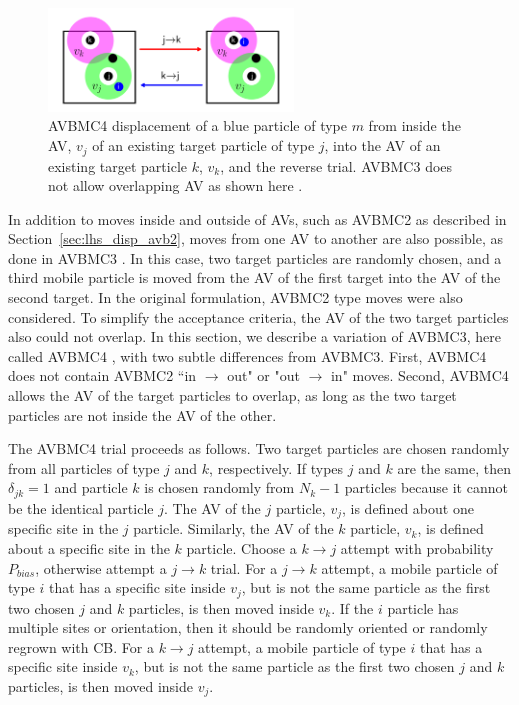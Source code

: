 \documentclass[
  9pt,
  bestpractices,
]{livecoms}
\begin{document}
\begin{figure}
\begin{centering}
\includegraphics[width=6.5cm]{../figures/avb4.png}
\caption{
AVBMC4 displacement of a blue particle of type $m$ from inside the AV, $v_j$ of an existing target particle of type $j$, into the AV of an existing target particle $k$, $v_k$, and the reverse trial.
AVBMC3 does not allow overlapping AV as shown here \cite{chen_improving_2001}.
}
\label{fig:avbmc4}
\end{centering}
\end{figure}

In addition to moves inside and outside of AVs, such as AVBMC2 as described in Section~\ref{sec:lhs_disp_avb2}, moves from one AV to another are also possible, as done in AVBMC3 \cite{chen_improving_2001}.
In this case, two target particles are randomly chosen, and a third mobile particle is moved from the AV of the first target into the AV of the second target.
In the original formulation, AVBMC2 type moves were also considered.
To simplify the acceptance criteria, the AV of the two target particles also could not overlap.
In this section, we describe a variation of AVBMC3, here called AVBMC4 \cite{siderius_flat-histogram_2024}, with two subtle differences from AVBMC3.
First, AVBMC4 does not contain AVBMC2 ``in $\rightarrow$ out" or "out $\rightarrow$ in" moves.
Second, AVBMC4 allows the AV of the target particles to overlap, as long as the two target particles are not inside the AV of the other.

The AVBMC4 trial proceeds as follows.
Two target particles are chosen randomly from all particles of type $j$ and $k$, respectively.
If types $j$ and $k$ are the same, then $\delta_{jk}=1$ and particle $k$ is chosen randomly from $N_k-1$ particles because it cannot be the identical particle $j$.
The AV of the $j$ particle, $v_j$, is defined about one specific site in the $j$ particle.
Similarly, the AV of the $k$ particle, $v_k$, is defined about a specific site in the $k$ particle.
Choose a $k\rightarrow j$ attempt with probability $P_{bias}$, otherwise attempt a $j\rightarrow k$ trial.
For a $j\rightarrow k$ attempt, a mobile particle of type $i$ that has a specific site inside $v_j$, but is not the same particle as the first two chosen $j$ and $k$ particles, is then moved inside $v_k$.
If the $i$ particle has multiple sites or orientation, then it should be randomly oriented or randomly regrown with CB.
For a $k\rightarrow j$ attempt, a mobile particle of type $i$ that has a specific site inside $v_k$, but is not the same particle as the first two chosen $j$ and $k$ particles, is then moved inside $v_j$.
\end{document}
